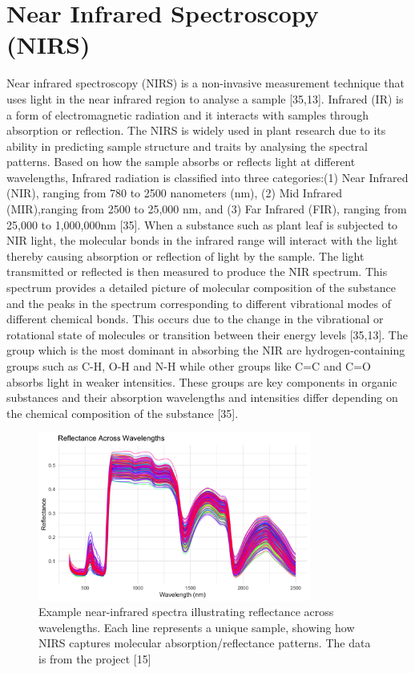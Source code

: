 \documentclass[12pt,a4paper]{report}
\begin{document}
\section{Near Infrared Spectroscopy (NIRS)}
Near infrared spectroscopy (NIRS) is a non-invasive measurement technique that uses light in
the near infrared region to analyse a sample [35,13]. Infrared (IR) is a form of electromagnetic
radiation and it interacts with samples through absorption or reflection. The NIRS is widely
used in plant research due to its ability in predicting sample structure and traits by analysing
the spectral patterns. Based on how the sample absorbs or reflects light at different wavelengths, Infrared radiation is classified into three categories:(1) Near Infrared (NIR), ranging from 780 to 2500 nanometers (nm), (2) Mid Infrared (MIR),ranging from 2500 to 25,000 nm, and (3) Far Infrared (FIR), ranging from 25,000 to 1,000,000nm [35]. When a substance such as plant leaf is subjected to NIR light, the molecular bonds in the infrared range will interact with the light thereby causing absorption or reflection of light by the sample. The light transmitted or reflected is then measured to produce the NIR spectrum. This spectrum provides a detailed picture of molecular composition of the substance and the peaks in the spectrum corresponding to different vibrational modes of different chemical bonds. This occurs due to the change in the vibrational or rotational state of molecules or transition between their energy levels [35,13]. The group which is the most dominant in absorbing the NIR are hydrogen-containing groups such as C-H, O-H and N-H while other groups like C=C and C=O absorbs light in weaker intensities. These groups are key components in organic substances and their absorption wavelengths and intensities differ depending on the chemical composition of the substance [35].\\ 

\begin{figure}[h]
    \centering
    \includegraphics[width=0.8\textwidth]{Figures/pablo_data.png} 
    \caption{Example near-infrared spectra illustrating reflectance across wavelengths. Each line represents a unique sample, showing how NIRS captures molecular absorption/reflectance patterns. The data is from the project [15]}
    \label{fig:nirs_spectra}
\end{figure}
\end{document}
